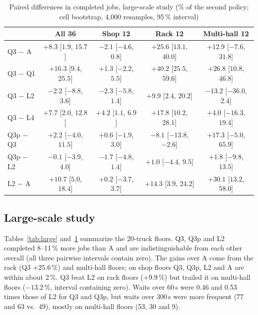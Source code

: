 \documentclass[conference]{IEEEtran}
\newcommand{\Qone}{Q1}
\newcommand{\Qthree}{Q3}
\newcommand{\Qthreep}{Q3p}
\begin{document}
\begin{table}[t]
\centering
\caption{Paired differences in completed jobs, large-scale study (\% of the
second policy; cell bootstrap, 4{,}000 resamples, 95\,\% interval)}
\label{tab:boot}
\footnotesize
\begin{tabular}{lcccc}
\toprule
 & All 36 & Shop 12 & Rack 12 & Multi-hall 12 \\
\midrule
\Qthree{} $-$ A        & $+8.3$ [$1.9$, $15.7$]   & $-2.1$ [$-4.6$, $0.8$] & $+25.6$ [$13.1$, $40.0$] & $+12.9$ [$-7.6$, $31.8$] \\
\Qthree{} $-$ \Qone    & $+16.3$ [$9.4$, $25.5$]  & $+1.3$ [$-2.2$, $5.5$] & $+40.2$ [$25.5$, $59.6$] & $+26.8$ [$10.8$, $46.8$] \\
\Qthree{} $-$ L2       & $-2.2$ [$-8.8$, $3.6$]   & $-2.3$ [$-5.8$, $1.4$] & $+9.9$ [$2.4$, $20.2$]   & $-13.2$ [$-36.0$, $2.4$] \\
\Qthree{} $-$ L4       & $+7.7$ [$2.0$, $12.8$]   & $+4.2$ [$1.1$, $6.9$]  & $+17.8$ [$10.2$, $28.1$] & $+4.0$ [$-16.3$, $19.4$] \\
\Qthreep{} $-$ \Qthree & $+2.2$ [$-4.0$, $11.5$]  & $+0.6$ [$-1.9$, $3.0$] & $-8.1$ [$-13.8$, $-2.6$] & $+17.3$ [$-5.0$, $65.9$] \\
\Qthreep{} $-$ L2      & $-0.1$ [$-3.9$, $4.0$]   & $-1.7$ [$-4.8$, $1.4$] & $+1.0$ [$-4.4$, $9.5$]   & $+1.8$ [$-9.8$, $13.5$] \\
L2 $-$ A               & $+10.7$ [$5.0$, $18.4$]  & $+0.2$ [$-3.7$, $3.7$] & $+14.3$ [$3.9$, $24.2$]  & $+30.1$ [$13.2$, $58.0$] \\
\bottomrule
\end{tabular}
\end{table}

\subsection{Large-scale study}
Tables~\ref{tab:large} and~\ref{tab:boot} summarize the 20-truck floors.
\Qthree, \Qthreep{} and L2 completed 8--11\,\% more jobs than A and are
indistinguishable from each other overall (all three pairwise intervals contain
zero). The gains over A come from the rack (\Qthree{} $+25.6$\,\%) and
multi-hall floors; on shop floors \Qthree, \Qthreep, L2 and A are within about 2\,\%.
\Qthree{} beat L2 on rack floors ($+9.9$\,\%) but trailed it on multi-hall
floors ($-13.2$\,\%, interval containing zero). Waits over 60\,s were 0.46 and
0.53 times those of L2 for \Qthree{} and \Qthreep, %
but waits over 300\,s were more frequent (77 and 63 vs.\ 49), mostly on
multi-hall floors (53, 30 and 9).
\end{document}
